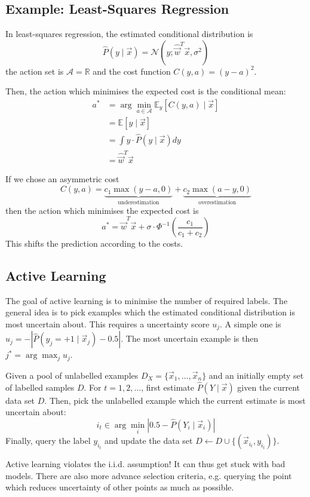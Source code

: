\subsection{Example: Least-Squares Regression}
In least-squares regression,
the estimated conditional distribution is
\begin{equation*}
    \hat{P}(y \mid \vec{x}) =
    \mathcal{N}(y ; \hat{\vec{w}}^T \vec{x}, \sigma^2)
\end{equation*}
the action set is
$\mathcal{A} = \mathbb{R}$ and
the cost function
$C(y, a) = (y - a)^2$.

Then, the action which minimises the
expected cost is the conditional mean:
\begin{align*}
    a^* &=
    \arg\min_{a \in \mathcal{A}}{
        \mathbb{E}_y[C(y, a) \mid \vec{x}]
    } \\
    &= \mathbb{E}[y \mid \vec{x}] \\
    &= \int{y \cdot \hat{P}(y \mid \vec{x}) dy} \\
    &= \hat{\vec{w}}^T \vec{x}
\end{align*}

If we chose an asymmetric cost
\begin{equation*}
    C(y, a) =
    \underbrace{c_1 \max{(y - a, 0)}}_\text{underestimation}
    +
    \underbrace{c_2 \max{(a - y, 0)}}_\text{overestimation}
\end{equation*}
then the action which minimises the
expected cost is
\begin{equation*}
    a^* = \hat{\vec{w}}^T \vec{x}
    + \sigma \cdot \Phi^{-1}\left(
    \frac{c_1}{c_1 + c_2}
    \right)
\end{equation*}
This shifts the prediction according
to the costs.


\subsection{Active Learning}
The goal of active learning is to minimise
the number of required labels.
The general idea is to pick examples
which the estimated conditional distribution
is most uncertain about.
This requires a uncertainty score $u_j$.
A simple one is
$u_j = -|\hat{P}(y_j = +1 \mid \vec{x}_j) - 0.5|$.
The most uncertain example is then
$j^* = \arg\max_j{u_j}$.

Given a pool of unlabelled examples
$D_X = \{\vec{x}_1, \dotsc, \vec{x}_n\}$
and an initially empty set of labelled
samples $D$.
For $t = 1, 2, \dotsc$, first
estimate $\hat{P}(Y \mid \vec{x})$
given the current data set $D$.
Then, pick the unlabelled example which
the current estimate is most uncertain
about:
\begin{equation*}
    i_t \in \arg\min_i{
        |0.5 - \hat{P}(Y_i \mid \vec{x}_i)|
    }
\end{equation*}
Finally, query the label $y_{i_t}$
and update the data set
$D \gets D \cup \{(\vec{x}_{i_t}, y_{i_t})\}$.

Active learning violates the i.i.d.
assumption!
It can thus get stuck with bad models.
There are also more advance selection
criteria,
e.g. querying the point which reduces
uncertainty of other points as much
as possible.
